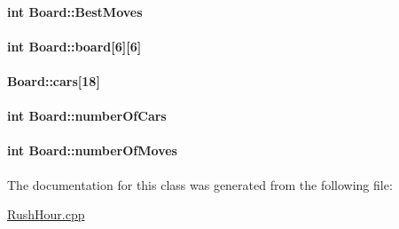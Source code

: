 \paragraph[{\texorpdfstring{Best\+Moves}{BestMoves}}]{\setlength{\rightskip}{0pt plus 5cm}int Board\+::\+Best\+Moves}\hypertarget{class_board_a8e15496239739e402313d3faa1555109}{}\label{class_board_a8e15496239739e402313d3faa1555109}
\paragraph[{\texorpdfstring{board}{board}}]{\setlength{\rightskip}{0pt plus 5cm}int Board\+::board\mbox{[}6\mbox{]}\mbox{[}6\mbox{]}\hspace{0.3cm}{\ttfamily [private]}}\hypertarget{class_board_af6b56eb0ed49c5e70ad84a5c5d7107a1}{}\label{class_board_af6b56eb0ed49c5e70ad84a5c5d7107a1}
\paragraph[{\texorpdfstring{cars}{cars}}]{ Board\+::cars\mbox{[}18\mbox{]}\hspace{0.3cm}{\ttfamily [private]}}\hypertarget{class_board_a8b994d570dded4c47c321ea5aadbb572}{}\label{class_board_a8b994d570dded4c47c321ea5aadbb572}
\paragraph[{\texorpdfstring{number\+Of\+Cars}{numberOfCars}}]{\setlength{\rightskip}{0pt plus 5cm}int Board\+::number\+Of\+Cars}\hypertarget{class_board_ae0cd5faf221be36798fd4fbd458bb10e}{}\label{class_board_ae0cd5faf221be36798fd4fbd458bb10e}
\paragraph[{\texorpdfstring{number\+Of\+Moves}{numberOfMoves}}]{\setlength{\rightskip}{0pt plus 5cm}int Board\+::number\+Of\+Moves}\hypertarget{class_board_a0f1716a3334ffba859db870d6b321a29}{}\label{class_board_a0f1716a3334ffba859db870d6b321a29}


The documentation for this class was generated from the following file\+:\begin{DoxyCompactItemize}
\item 
\hyperlink{_rush_hour_8cpp}{Rush\+Hour.\+cpp}\end{DoxyCompactItemize}
